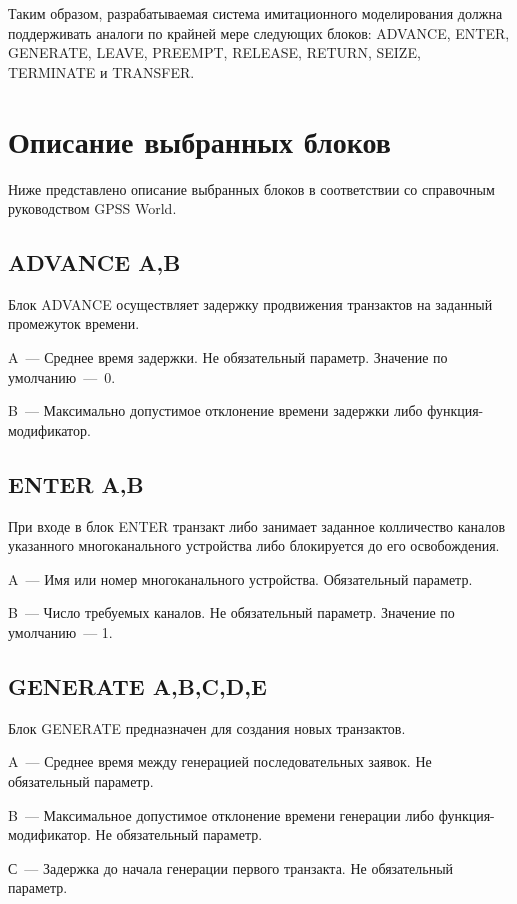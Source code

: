 Таким образом, разрабатываемая система имитационного моделирования должна поддерживать аналоги по крайней мере следующих блоков: ADVANCE, ENTER, GENERATE, LEAVE, PREEMPT, RELEASE, RETURN, SEIZE, TERMINATE и TRANSFER.

\section{Описание выбранных блоков}

Ниже представлено описание выбранных блоков в соответствии со справочным руководством GPSS World.\cite{GPSSRef}

\subsection*{ADVANCE A,B}

Блок ADVANCE осуществляет задержку продвижения транзактов на заданный промежуток времени.

A~--- Среднее время задержки. Не обязательный параметр. Значение по умолчанию~---~0.

B~--- Максимально допустимое отклонение времени задержки либо функция-модификатор.

\subsection*{ENTER A,B}

При входе в блок ENTER транзакт либо занимает заданное колличество каналов указанного многоканального устройства либо блокируется до его освобождения.

A~--- Имя или номер многоканального устройства. Обязательный параметр.

B~--- Число требуемых каналов. Не обязательный параметр. Значение по умолчанию~--- 1.

\subsection*{GENERATE A,B,C,D,E}

Блок GENERATE предназначен для создания новых транзактов.

A~--- Среднее время между генерацией последовательных заявок. Не обязательный параметр.

B~--- Максимальное допустимое отклонение времени генерации либо функция-модификатор. Не обязательный параметр.

С~--- Задержка до начала генерации первого транзакта. Не обязательный параметр.

